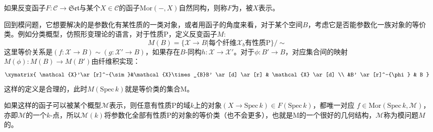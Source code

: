\begin{definition}
	如果反变函子$ F:\mathscr{C}\to \mathfrak{Set} $与某个$ X\in\mathscr{C} $的函子$ \mathrm{Mor}(-,X) $自然同构，则称$ F $为，被$ X $表示。
\end{definition}
回到模问题，它想要解决的是参数化有某性质的一类对象，或者用函子的角度来看，对于某个空间$ B $，考虑它是否能参数化一族对象的等价类。例如分类概型，仿照形变理论的语言，对于性质P，定义反变函子$ M $:
$$M(B)=\{ \mathcal{X}\to B| \text{每个纤维}\mathcal{X}_b\text{有性质P} \}/\sim $$
这里等价关系是$ (f:\mathcal{X}\to B) \sim (g:\mathcal{X'}\to B) $，如果存在$ B $-同构$ h:\mathcal{X}\to\mathcal{ X'} $。对于$ \phi: B'\to B $，对应集合间的映射$ M(\phi):M(B)\to M(B') $由纤维积实现：
$$ \xymatrix{
	\mathcal{X}'\ar[r]^-{\sim}&\mathcal{X}\times_{B}B' \ar[d] \ar[r] & \mathcal{X} \ar[d] \\
	&B' \ar[r]^-{\phi} & B
} $$
这样的定义是合理的，此时$ M(\mathrm{Spec}\,k) $就是等价类的集合$ \mathrm{M} $。

如果这样的函子可以被某个概型$ \mathcal{M} $表示，则任意有性质P的域$ k $上的对象$(X\to \mathrm{Spec}\, k)\in  F(\mathrm{Spec}\, k)$，都唯一对应 $f\in \mathrm{Mor}(\mathrm{Spec}\, k,\mathcal{M}) $，亦即$ \mathcal{M} $的一个$ k $-点，所以$ \mathcal{M}(k) $将参数化全部有性质P的对象的等价类（也不会更多），也就是$ \mathrm{M} $的一个很好的几何结构，$ \mathcal{M} $称为模问题$ M $的。

